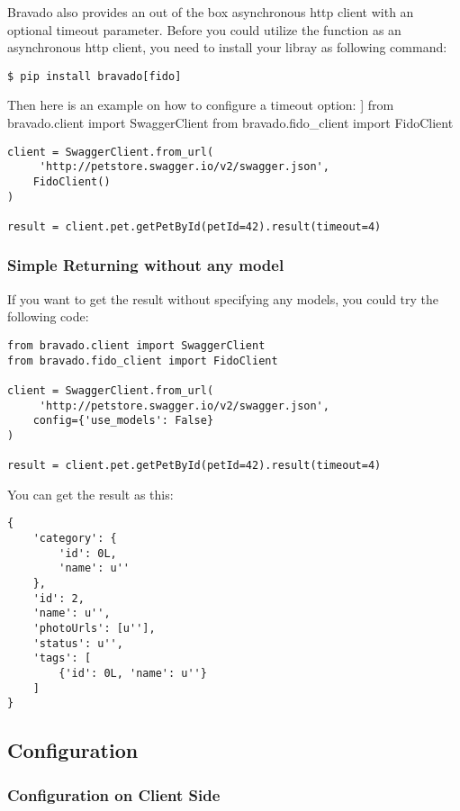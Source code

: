 Bravado also provides an out of the box asynchronous http client with an
optional timeout parameter. Before you could utilize the function as an
asynchronous http client, you need to install your libray as following
command:

\begin{lstlisting}
$ pip install bravado[fido]
\end{lstlisting}

Then here is an example on how to configure a timeout option: {]} from
bravado.client import SwaggerClient from bravado.fido\_client import
FidoClient

\begin{lstlisting}
client = SwaggerClient.from_url(
     'http://petstore.swagger.io/v2/swagger.json',
    FidoClient()
)

result = client.pet.getPetById(petId=42).result(timeout=4)
\end{lstlisting}

\subsubsection{Simple Returning without any model}

If you want to get the result without specifying any models, you could
try the following code:

\begin{lstlisting}
from bravado.client import SwaggerClient
from bravado.fido_client import FidoClient

client = SwaggerClient.from_url(
     'http://petstore.swagger.io/v2/swagger.json',
    config={'use_models': False}
)

result = client.pet.getPetById(petId=42).result(timeout=4)
\end{lstlisting}

You can get the result as this:

\begin{lstlisting}
{
    'category': {
        'id': 0L,
        'name': u''
    },
    'id': 2,
    'name': u'',
    'photoUrls': [u''],
    'status': u'',
    'tags': [
        {'id': 0L, 'name': u''}
    ]
}
\end{lstlisting}

\subsection{Configuration}

\subsubsection{Configuration on Client Side}

